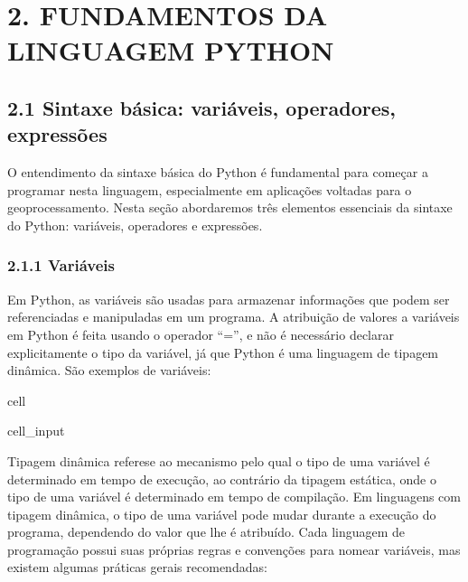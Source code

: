 \documentclass[letterpaper,10pt,english]{jupyterBook}
\begin{document}
\sphinxstepscope


\chapter{2. FUNDAMENTOS DA LINGUAGEM PYTHON}
\label{\detokenize{capitulo2:fundamentos-da-linguagem-python}}\label{\detokenize{capitulo2::doc}}

\section{2.1 Sintaxe básica: variáveis, operadores, expressões}
\label{\detokenize{capitulo2:sintaxe-basica-variaveis-operadores-expressoes}}
\sphinxAtStartPar
O entendimento da sintaxe básica do Python é fundamental para começar a programar nesta linguagem, especialmente em aplicações voltadas para o geoprocessamento. Nesta seção abordaremos três elementos essenciais da sintaxe do Python: variáveis, operadores e expressões.


\subsection{2.1.1 Variáveis}
\label{\detokenize{capitulo2:variaveis}}
\sphinxAtStartPar
Em Python, as variáveis são usadas para armazenar informações que podem ser referenciadas e manipuladas em um programa. A atribuição de valores a variáveis em Python é feita usando o operador “=”, e não é necessário declarar explicitamente o tipo da variável, já que Python é uma linguagem de tipagem dinâmica. São exemplos de variáveis:

\begin{sphinxuseclass}{cell}\begin{sphinxVerbatimInput}

\begin{sphinxuseclass}{cell_input}
\begin{sphinxVerbatim}[commandchars=\\\{\}]
  
  
        
                
  
\end{sphinxVerbatim}

\end{sphinxuseclass}\end{sphinxVerbatimInput}

\end{sphinxuseclass}
\sphinxAtStartPar
Tipagem dinâmica refere\sphinxhyphen{}se ao mecanismo pelo qual o tipo de uma variável é determinado em tempo de execução, ao contrário da tipagem estática, onde o tipo de uma variável é determinado em tempo de compilação. Em linguagens com tipagem dinâmica, o tipo de uma variável pode mudar durante a execução do programa, dependendo do valor que lhe é atribuído.
Cada linguagem de programação possui suas próprias regras e convenções para nomear variáveis, mas existem algumas práticas gerais recomendadas:
\end{document}
